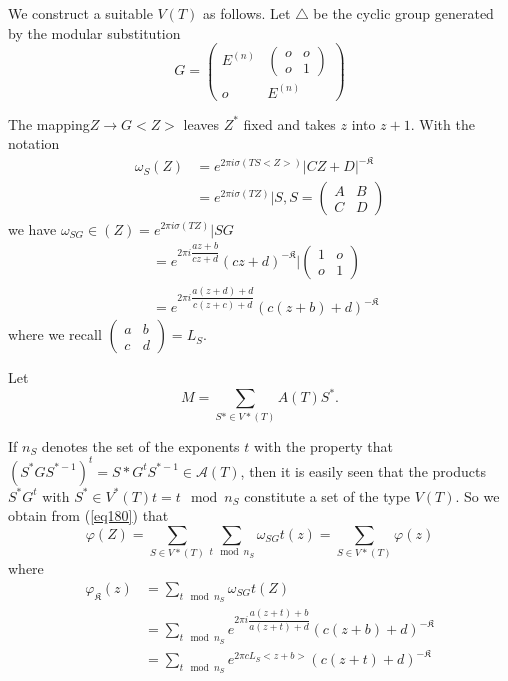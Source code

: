 We construct a suitable $V (T)$ as follows. Let $\triangle$ be the
cyclic group generated by the modular substitution 
$$
G = \begin{pmatrix} E^{(n)} & \begin{pmatrix} o & o \\ o &
    1 \end{pmatrix} \\ o & E^{(n)}\end{pmatrix} 
$$

The mapping\pageoriginale  $Z \to G <Z>$ leaves $Z^*$ fixed and takes
$z$ into $z+1$. With the notation  
\begin{align*}
\omega_S(Z) & = e^{2 \pi i \sigma (T S <Z> )} | CZ  + D|^{-
  \mathfrak{K}}\\ 
& = e^{2 \pi i \sigma (T Z)} | S,  S = \begin{pmatrix} A & B \\ C &
  D \end{pmatrix} 
\end{align*}
we have $\omega_{SG} \in (Z) = e^{2 \pi i \sigma (T Z)} | S G$ 
\begin{align*}
& = e^{2 \pi i \dfrac{a z +b}{cz + d}} (cz + d)^{-\mathfrak{K}}
  | \begin{pmatrix} 1 & o \\ o & 1 \end{pmatrix}\\ 
& = e^{2 \pi i \dfrac{a(z+d)+d}{c(z+c)+d}} (c (z + b) +d)^{-\mathfrak{K}}
\end{align*}
where we recall $\begin{pmatrix} a & b \\ c & d \end{pmatrix} = L_S$. 

Let 
$$
M = \sum_{S* \in V* (T)} A (T) S^*.
$$

If $n_S$ denotes the set of the exponents $t$ with the property that\break
$(S^*G S^{* -1})^t = S* G^t S^{* - 1} \in \mathcal{A} (T)$, then it is
easily seen that the products $S^* G^t$ with $S^* \in V^* (T) t = t
\mod n_S$ constitute a set of the type $V (T)$. So we obtain from
(\ref{eq180}) that  
\begin{equation*}
\varphi (Z) = \sum_{S \in V* (T)} \sum_{t \mod n_S} \omega_{SG} t (z)
= \sum_{S \in V* (T)} \varphi (z) \tag{181}\label{eq181}  
\end{equation*}
where
\begin{align*}
\varphi_\mathfrak{K} (z) & = \sum_{t \mod n_S} \omega_{SG}t (Z)\\ 
& = \sum_{t \mod n_S} e^{2 \pi i \dfrac{a(z+t)+b}{a(z+t)+d}}
(c(z+b)+d)^{-\mathfrak{K}}\\ 
&= \sum_{t \mod n_S} e^{2 \pi c L_S< z + b>}
(c(z+t)+d)^{-\mathfrak{K}} \tag{182}\label{eq182}  
\end{align*}

